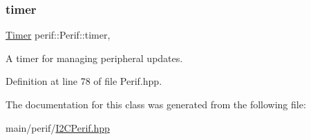 \subsubsection{\texorpdfstring{timer}{timer}}
{\footnotesize\ttfamily \mbox{\hyperlink{classTimer}{Timer}} perif\+::\+Perif\+::timer\hspace{0.3cm}{\ttfamily [protected]}, {\ttfamily [inherited]}}

A timer for managing peripheral updates. 

Definition at line 78 of file Perif.\+hpp.



The documentation for this class was generated from the following file\+:\begin{DoxyCompactItemize}
\item 
main/perif/\mbox{\hyperlink{I2CPerif_8hpp}{I2\+C\+Perif.\+hpp}}\end{DoxyCompactItemize}
